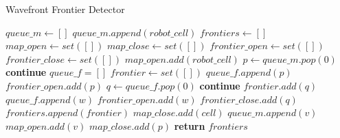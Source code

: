 \FloatBarrier
\begin{algorithm}
    \caption{Wavefront Frontier Detector}
    \label{wavefront_frontier_detector}
    \begin{algorithmic}[1]
        \State $queue\_m \gets []$
        \State $queue\_m.append(robot\_cell)$
        \State $frontiers \gets []$
        \State $map\_open \gets set([])$
        \State $map\_close \gets set([])$
        \State $frontier\_open \gets set([])$
        \State $frontier\_close \gets set([])$
        \State $map\_open.add(robot\_cell)$
            \State $p \gets queue\_m.pop(0)$
                \State \textbf{continue}
            \EndIf
                \State $queue\_f = []$
                \State $frontier \gets set([])$
                \State $queue\_f.append(p)$
                \State $frontier\_open.add(p)$
                    \State $q \gets queue\_f.pop(0)$
                        \State \textbf{continue}
                    \EndIf
                        \State $frontier.add(q)$
                                \State $queue\_f.append(w)$
                                \State $frontier\_open.add(w)$
                            \EndIf
                        \EndFor
                    \EndIf
                    \State $frontier\_close.add(q)$
                \EndWhile
                \State $frontiers.append(frontier)$
                    \State $map\_close.add(cell)$
                \EndFor
            \EndIf
                    \State $queue\_m.append(v)$
                    \State $map\_open.add(v)$
                \EndIf
            \EndFor
            \State $map\_close.add(p)$
        \EndWhile
        \State \textbf{return} $frontiers$
    \end{algorithmic}
\end{algorithm}
\FloatBarrier

